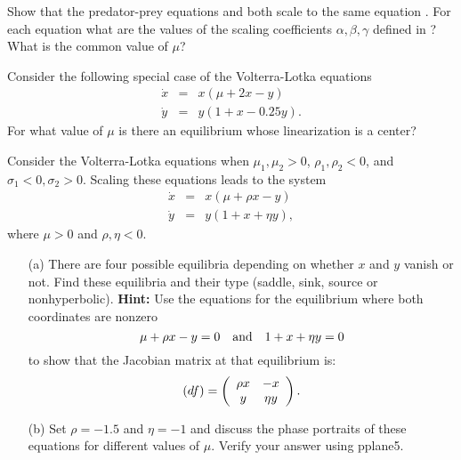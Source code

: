 \begin{exercise} \label{c9.1.6}
Show that the predator-prey equations  and  both 
scale to the same equation .  For each equation what are the 
values of the scaling coefficients $\alpha,\beta,\gamma$ defined in 
?  What is the common value of $\mu$?
\end{exercise}



\begin{exercise} \label{c9.1.2}
Consider the following special case of the Volterra-Lotka equations 
\begin{eqnarray*}
\dot{x} & = & x(\mu + 2x -     y)  \\
\dot{y} & = & y(  1 +  x - 0.25y).
\end{eqnarray*}
For what value of $\mu$ is there an equilibrium whose linearization is a 
center?   
\end{exercise}

\begin{exercise} \label{c9.1.1}
Consider the Volterra-Lotka equations when $\mu_1,\mu_2>0$, 
$\rho_1,\rho_2 < 0$, and $\sigma_1<0,\sigma_2>0$. Scaling these 
equations leads to the system
\begin{equation*}
\begin{array}{rcl}
\dot{x} & = & x(\mu + \rho x -         y)  \\
\dot{y} & = & y(  1 +        x +  \eta y),
\end{array}
\end{equation*}
where $\mu>0$ and $\rho,\eta<0$.  
\begin{itemize}
\item[(a)]  There are four possible equilibria depending on whether $x$ and 
$y$ vanish or not.  Find these equilibria and their type (saddle, sink, 
source or nonhyperbolic).  {\bf Hint:} Use the equations for the equilibrium 
where both coordinates are nonzero 
\[
\mu + \rho x - y = 0 \quad\mbox{and}\quad  1 + x +  \eta y = 0
\]
to show that the Jacobian matrix at that equilibrium is:
\[
(df) =\left(\begin{array}{cc} \rho x & -x\\ y &\eta y\end{array}\right).
\]
\item[(b)]  Set $\rho=-1.5$ and $\eta=-1$ and discuss the phase portraits 
of these equations for different values of $\mu$.  Verify your answer 
using {\sf pplane5}. 
\end{itemize}
\end{exercise}



\CEXER

